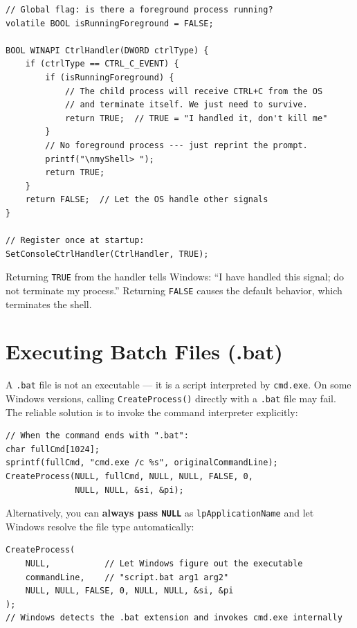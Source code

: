 \documentclass[12pt,a4paper]{article}
\begin{document}
\begin{lstlisting}
// Global flag: is there a foreground process running?
volatile BOOL isRunningForeground = FALSE;

BOOL WINAPI CtrlHandler(DWORD ctrlType) {
    if (ctrlType == CTRL_C_EVENT) {
        if (isRunningForeground) {
            // The child process will receive CTRL+C from the OS
            // and terminate itself. We just need to survive.
            return TRUE;  // TRUE = "I handled it, don't kill me"
        }
        // No foreground process --- just reprint the prompt.
        printf("\nmyShell> ");
        return TRUE;
    }
    return FALSE;  // Let the OS handle other signals
}

// Register once at startup:
SetConsoleCtrlHandler(CtrlHandler, TRUE);
\end{lstlisting}

\begin{importantbox}
    Returning \texttt{TRUE} from the handler tells Windows: ``I have handled this signal; do not terminate my process.'' Returning \texttt{FALSE} causes the default behavior, which terminates the shell.
\end{importantbox}

\section{Executing Batch Files (.bat)}

A \texttt{.bat} file is not an executable --- it is a script interpreted by \texttt{cmd.exe}. On some Windows versions, calling \texttt{CreateProcess()} directly with a \texttt{.bat} file may fail. The reliable solution is to invoke the command interpreter explicitly:

\begin{lstlisting}
// When the command ends with ".bat":
char fullCmd[1024];
sprintf(fullCmd, "cmd.exe /c %s", originalCommandLine);
CreateProcess(NULL, fullCmd, NULL, NULL, FALSE, 0,
              NULL, NULL, &si, &pi);
\end{lstlisting}

Alternatively, you can \textbf{always pass \texttt{NULL}} as \texttt{lpApplicationName} and let Windows resolve the file type automatically:

\begin{lstlisting}
CreateProcess(
    NULL,           // Let Windows figure out the executable
    commandLine,    // "script.bat arg1 arg2"
    NULL, NULL, FALSE, 0, NULL, NULL, &si, &pi
);
// Windows detects the .bat extension and invokes cmd.exe internally
\end{lstlisting}
\end{document}
